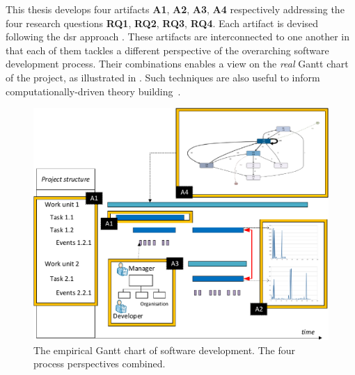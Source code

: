 %
%

This thesis develops four artifacts \textbf{A1}, \textbf{A2}, \textbf{A3}, \textbf{A4} respectively addressing the four research questions \textbf{RQ1}, \textbf{RQ2}, \textbf{RQ3}, \textbf{RQ4}. Each artifact is devised following the \gls{dsr} approach \citep{Peffers2008}. These artifacts are interconnected to one another in that each of them tackles a different perspective of the overarching software development process. Their combinations enables a view on the \emph{real} Gantt chart of the project, as illustrated in . Such techniques are also useful to inform computationally-driven theory building~\citep{DBLP:journals/isr/BerenteSS19}.

\begin{figure}[]
	\centering
	\includegraphics[width=\linewidth]{figures/big-solution2-crop.pdf}
	\caption{The empirical Gantt chart of software development. The four process perspectives combined.}
	\label{fig:big-solution}
\end{figure}

